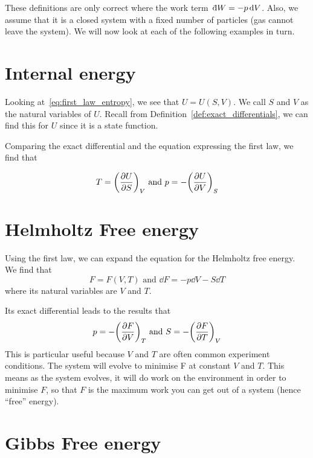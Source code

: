\documentclass[12pt,chapterprefix=false,dvipsnames]{scrbook}
\theoremstyle{dotless}
\theoremstyle{definition}
\def\dbar{{\mathchar'26\mkern-10mu \mathrm{d}}}
\begin{document}
These definitions are only correct where the work term\,
$\dbar W = -p \dd{V}$. Also, we assume that it is a closed
system with a fixed number of particles (gas cannot leave the
system). We will now look at each of the following examples in
turn.

\section{Internal energy}%
\label{sec:internal_energy}

Looking at~\ref{eq:first_law_entropy}, we see that
$U = U(S,V)$. We call $S$ and
$V$ as the natural variables of
$U$. Recall from
Definition~\ref{def:exact_differentials}, we can find this for
$U$ since it is a state function.

Comparing the exact differential and the equation expressing the
first law, we find that

\begin{equation}
	T = {\left(\pdv{U}{S}\right)}_V\,\,\text{and}\,\, p
	= -{\left(\pdv{U}{V}\right)}_S
\end{equation}

\section{Helmholtz Free energy}%
\label{sec:helmholtz_free_energy}

Using the first law, we can expand the equation for the
Helmholtz free energy. We find that
\begin{equation}
	\label{eq:helmholtz_free_energy}
	F = F(V,T)\,\, \text{and}
	\,\,\dd{F} = -p\dd{V} -
	S\dd{T}
\end{equation}
where its natural variables are $V$ and
$T$.

Its exact differential leads to the results that
\begin{equation}
	p = -{\left(\pdv{F}{V}\right)}_T\,\, \text{and}
	\,\, S = -{\left(\pdv{F}{T}\right)}_V
\end{equation}
This is particular useful because $V$ and
$T$ are often common experiment conditions.
The system will evolve to minimise F at constant
$V$ and $T$. This means
as the system evolves, it will do work on the environment in
order to minimise $F$, so that
$F$ is the maximum work you can get out of a
system (hence ``free'' energy).

\section{Gibbs Free energy}%
\label{sec:gibbs_free_energy}
\end{document}
